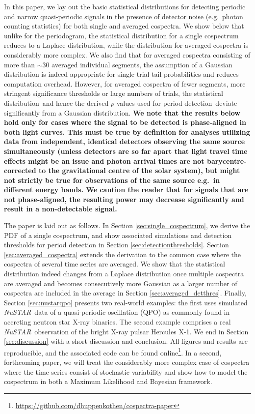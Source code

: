 \documentclass[12pt]{emulateapj}
\newcommand{\project}[1]{\textsl{#1}}
\newcommand{\nustar}{\project{NuSTAR}\xspace}
\begin{document}
In this paper, we lay out the basic statistical distributions for detecting periodic and narrow quasi-periodic signals in the presence of detector noise (e.g.\ photon counting statistics) for both single and averaged cospectra. We show below that unlike for the periodogram, the statistical distribution for a single cospectrum reduces to a Laplace distribution, while the distribution for averaged cospectra is considerably more complex. We also find that for averaged cospectra consisting of more than $\sim$30 averaged individual segments, the assumption of a Gaussian distribution is indeed appropriate for single-trial tail probabilities and reduces computation overhead. However, for averaged cospectra of fewer segments, more stringent significance thresholds or large numbers of trials, the statistical distribution--and hence the derived $p$-values used for period detection--deviate significantly from a Gaussian distribution. \textbf{We note that the results below hold only for cases where the signal to be detected is phase-aligned in both light curves. This must be true by definition for analyses utilizing data from independent, identical detectors observing the same source simultaneously (unless detectors are so far apart that light travel time effects might be an issue and photon arrival times are not barycentre-corrected to the gravitational centre of the solar system), but might not strictly be true for observations of the same source e.g.\ in different energy bands. We caution the reader that for signals that are not phase-aligned, the resulting power may decrease significantly and result in a non-detectable signal.}

The paper is laid out as follows. In Section \ref{sec:single_cospectrum}, we derive the PDF of a single cospectrum, and show associated simulations and detection thresholds for period detection in Section \ref{sec:detectionthresholds}. Section \ref{sec:averaged_cospectra} extends the derivation to the common case where the cospectra of several time series are averaged. We show that the statistical distribution indeed changes from a Laplace distribution once multiple cospectra are averaged and becomes consecutively more Gaussian as a larger number of cospectra are included in the average in Section \ref{sec:averaged_detthres}. Finally, Section \ref{sec:nustarqpo} presents two real-world examples: the first uses simulated \nustar\ data of a quasi-periodic oscillation (QPO) as commonly found in accreting neutron star X-ray binaries. The second example comprises a real \nustar\ observation of the bright X-ray pulsar Hercules X-1. We end in Section \ref{sec:discussion} with a short discussion and conclusion. All figures and results are reproducible, and the associated code can be found online\footnote{\url{https://github.com/dhuppenkothen/cospectra-paper}}.
In a second, forthcoming paper, we will treat the considerably more complex case of cospectra where the time series consist of stochastic variability and show how to model the cospectrum in both a Maximum Likelihood and Bayesian framework.
\end{document}

